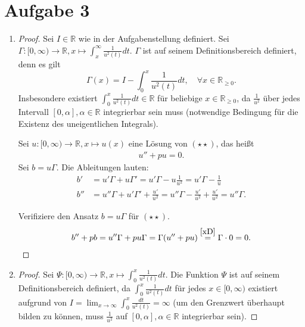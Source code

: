\documentclass[a4paper, landscape,twocolumn,fontsize=8pt,DIV=1]{scrartcl}
\theoremstyle{plain}
\begin{document}
\section*{Aufgabe 3}
\begin{enumerate}[label=(\alph*)]
    \item 
    \begin{proof}
    Sei $I \in \mathbb R$ wie in der Aufgabenstellung definiert. Sei $\Gamma: [0,\infty) \to \mathbb R, x \mapsto \int^\infty_x \frac{1}{u^2(t)}dt$. $\Gamma$ ist auf seinem Definitionsbereich definiert, denn es gilt 
    \[
        \Gamma(x) = I - \int^x_0 \frac{1}{u^2(t)}dt, \quad \forall x \in \mathbb R_{\geq 0}.
    \]
    Insbesondere existiert $\int^x_0 \frac{1}{u^2(t)}dt \in \mathbb R$ für beliebige $x \in \mathbb R_{\geq0}$, da $\frac{1}{u^2}$ über jedes Intervall $[0,\alpha], \alpha \in \mathbb R$ integrierbar sein muss (notwendige Bedingung für die Existenz des uneigentlichen Integrals).
    
    Sei $u: [0,\infty) \to \mathbb R, x \mapsto u(x)$ eine Lösung von $(\star\star)$, das heißt
    \begin{align}\label{xD}
        u'' + pu = 0.
    \end{align}
    Sei $b = u\Gamma$. Die Ableitungen lauten:
    \begin{align*}
        b' &= u'\Gamma + u\Gamma' = u'\Gamma - u\frac{1}{u^2} = u'\Gamma - \frac{1}{u} \\
        b'' &= u'' \Gamma + u' \Gamma' + \frac{u'}{u^2} = u''\Gamma -\frac{u'}{u^2} + \frac{u'}{u^2} = u'' \Gamma.
    \end{align*}
    
    Verifiziere den Ansatz $b = u\Gamma$ für $(\star\star)$. 
    \begin{align*}
        b'' +pb = u'' \Gamma + p u\Gamma = \Gamma(u'' +pu) \overset{\eqref{xD}}{=} \Gamma \cdot 0 = 0. 
    \end{align*}
    \end{proof}
    
    \item \begin{proof}
        Sei $\Psi: [0,\infty) \to \mathbb R, x \mapsto \int^x_0 \frac{1}{u^2(t)}dt$. Die Funktion $\Psi$ ist auf seinem Definitionsbereich definiert, da $\int^x_0 \frac{1}{u^2(t)}dt$ für jedes $x \in [0, \infty)$ existiert aufgrund von $I = \lim_{x \to \infty} \int^x_0\frac{dt}{u^2(t)} = \infty$ (um den Grenzwert überhaupt bilden zu können, muss $\frac{1}{u^2}$ auf $[0,\alpha], \alpha \in \mathbb R$ integrierbar sein).
        

\end{proof}
\end{enumerate}
\end{document}
